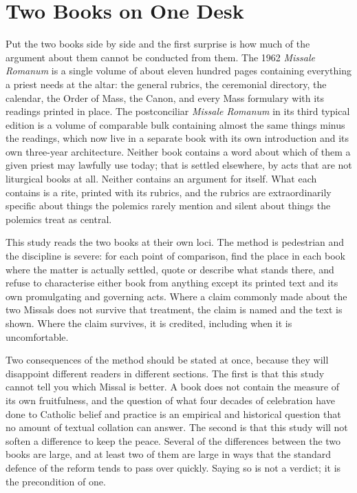 \section{Two Books on One Desk}

Put the two books side by side and the first surprise is how much of the argument about them cannot be conducted from them. The 1962 \emph{Missale Romanum} is a single volume of about eleven hundred pages containing everything a priest needs at the altar: the general rubrics, the ceremonial directory, the calendar, the Order of Mass, the Canon, and every Mass formulary with its readings printed in place. The postconciliar \emph{Missale Romanum} in its third typical edition is a volume of comparable bulk containing almost the same things minus the readings, which now live in a separate book with its own introduction and its own three-year architecture. Neither book contains a word about which of them a given priest may lawfully use today; that is settled elsewhere, by acts that are not liturgical books at all. Neither contains an argument for itself. What each contains is a rite, printed with its rubrics, and the rubrics are extraordinarily specific about things the polemics rarely mention and silent about things the polemics treat as central.

This study reads the two books at their own loci. The method is pedestrian and the discipline is severe: for each point of comparison, find the place in each book where the matter is actually settled, quote or describe what stands there, and refuse to characterise either book from anything except its printed text and its own promulgating and governing acts. Where a claim commonly made about the two Missals does not survive that treatment, the claim is named and the text is shown. Where the claim survives, it is credited, including when it is uncomfortable.

Two consequences of the method should be stated at once, because they will disappoint different readers in different sections. The first is that this study cannot tell you which Missal is better. A book does not contain the measure of its own fruitfulness, and the question of what four decades of celebration have done to Catholic belief and practice is an empirical and historical question that no amount of textual collation can answer. The second is that this study will not soften a difference to keep the peace. Several of the differences between the two books are large, and at least two of them are large in ways that the standard defence of the reform tends to pass over quickly. Saying so is not a verdict; it is the precondition of one.

